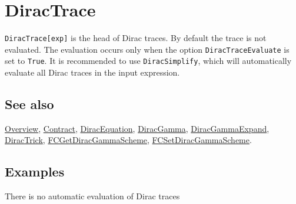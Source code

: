 \documentclass[../FeynCalcManual.tex]{subfiles}
\begin{document}
\begin{Shaded}
\begin{Highlighting}[]
 
\end{Highlighting}
\end{Shaded}

\begin{Shaded}
\begin{Highlighting}[]
 
\end{Highlighting}
\end{Shaded}

\hypertarget{diractrace}{
\section{DiracTrace}\label{diractrace}}

\texttt{DiracTrace[\allowbreak{}exp]} is the head of Dirac traces. By
default the trace is not evaluated. The evaluation occurs only when the
option \texttt{DiracTraceEvaluate} is set to \texttt{True}. It is
recommended to use \texttt{DiracSimplify}, which will automatically
evaluate all Dirac traces in the input expression.

\subsection{See also}

\hyperlink{toc}{Overview}, \hyperlink{contract}{Contract},
\hyperlink{diracequation}{DiracEquation},
\hyperlink{diracgamma}{DiracGamma},
\hyperlink{diracgammaexpand}{DiracGammaExpand},
\hyperlink{diractrick}{DiracTrick},
\hyperlink{fcgetdiracgammascheme}{FCGetDiracGammaScheme},
\hyperlink{fcsetdiracgammascheme}{FCSetDiracGammaScheme}.

\subsection{Examples}

There is no automatic evaluation of Dirac traces

\begin{Shaded}
\begin{Highlighting}[]
\OperatorTok{[}\OperatorTok{[}\SpecialCharTok{\textbackslash{}}\OperatorTok{[}\OperatorTok{],} \SpecialCharTok{\textbackslash{}}\OperatorTok{[}\OperatorTok{]]]}
\end{Highlighting}
\end{Shaded}
\end{document}
